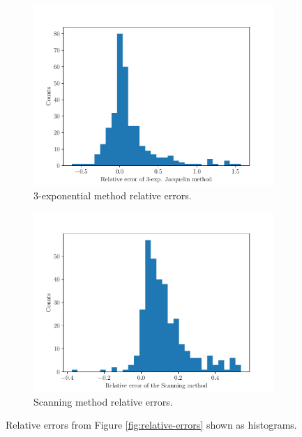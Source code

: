 \begin{figure}[ht]
	\centering
	\begin{subfigure}{0.45\textwidth}
		\centering
		\includegraphics[width=\textwidth]{figures/3exp-residuals}
		\caption{3-exponential method relative errors.}
		\label{fig:3exp-histogram}
	\end{subfigure}
	\hfill
	\begin{subfigure}{0.45\textwidth}
		\centering
		\includegraphics[width=\textwidth]{figures/scan-residuals}
		\caption{Scanning method relative errors.}
		\label{fig:scan-histogram}
	\end{subfigure}
	\caption{Relative errors from Figure \ref{fig:relative-errors} shown as histograms.}
	\label{fig:relative-errors-hists}
\end{figure}

